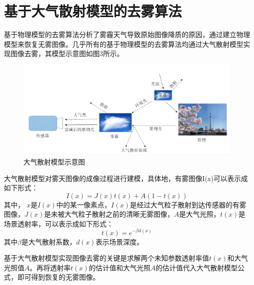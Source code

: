 \documentclass[12pt]{article}
\begin{document}
\section{基于大气散射模型的去雾算法}


基于物理模型的去雾算法分析了雾霾天气导致原始图像降质的原因，通过建立物理模型来恢复无雾图像。几乎所有的基于物理模型的去雾算法均通过大气散射模型实现图像去雾，其模型示意图如图3所示。
\begin{figure}[h]
    \centering
    \includegraphics[width=\textwidth]{pic/pic3.png}
    \caption{大气散射模型示意图}
\end{figure}


大气散射模型对雾天图像的成像过程进行建模，具体地，有雾图像I(x)可以表示成如下形式：
\begin{equation}
    I(x)=J(x) t(x)+A(1-t(x))
\end{equation}
其中， $x$是$I(x)$中的某一像素点，$I(x)$是经过大气粒子散射到达传感器的有雾图像，$J(x)$是未被大气粒子散射之前的清晰无雾图像，$A$是大气光照，$t(x)$是场景透射率，可以表示成如下形式：
\begin{equation}
    t(x)=e^{-\beta d(x)}
\end{equation}
其中$\beta$是大气散射系数，$d(x)$表示场景深度。

基于大气散射模型实现图像去雾的关键是求解两个未知参数透射率值$t(x)$和大气光照值$A$。再将透射率$t(x)$的估计值和大气光照$A$的估计值代入大气散射模型公式，即可得到恢复的无雾图像。
\end{document}

